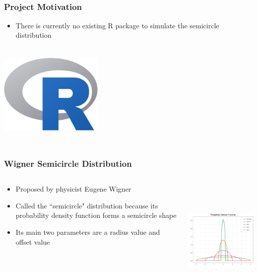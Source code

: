 \documentclass[handout, xcolor=dvipsnames]{beamer}
\begin{document}
\subsection{}
\begin{frame}
	\frametitle{Project Motivation}
	\begin{itemize}
    	\item There is currently no existing R package to simulate the semicircle distribution
    \end{itemize}
    \begin{center}
        \includegraphics[width=5cm,height=5cm]{Figures/Rlogo.png}
    \end{center}
\end{frame}


\subsection{}
\begin{frame}
	\frametitle{Wigner Semicircle Distribution}
            \begin{columns}[T]
                \begin{column}{.4\textwidth}
            	\begin{itemize}
                	\item Proposed by physicist Eugene Wigner
                        \item Called the ``semicircle" distribution because its probability density function forms a semicircle shape
                        \item Its main two parameters are a radius value and offset value
                    \end{itemize}
                \end{column}
                \begin{column}{.6\textwidth}
                    \includegraphics[width=6.5cm,height=6cm]{Figures/PDF_plot.png}
                \end{column}
            \end{columns}
\end{frame}
\end{document}
